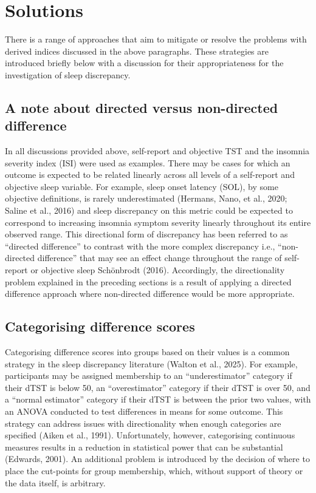\documentclass[
]{article}
\begin{document}
\section{Solutions}\label{solutions}

There is a range of approaches that aim to mitigate or resolve the problems with derived indices discussed in the above paragraphs. These strategies are introduced briefly below with a discussion for their appropriateness for the investigation of sleep discrepancy.

\subsection{A note about directed versus non-directed difference}\label{a-note-about-directed-versus-non-directed-difference}

In all discussions provided above, self-report and objective TST and the insomnia severity index (ISI) were used as examples. There may be cases for which an outcome is expected to be related linearly across all levels of a self-report and objective sleep variable. For example, sleep onset latency (SOL), by some objective definitions, is rarely underestimated (Hermans, Nano, et al., 2020; Saline et al., 2016) and sleep discrepancy on this metric could be expected to correspond to increasing insomnia symptom severity linearly throughout its entire observed range. This directional form of discrepancy has been referred to as ``directed difference'' to contrast with the more complex discrepancy i.e., ``non-directed difference'' that may see an effect change throughout the range of self-report or objective sleep Schönbrodt (2016). Accordingly, the directionality problem explained in the preceding sections is a result of applying a directed difference approach where non-directed difference would be more appropriate.

\subsection{Categorising difference scores}\label{categorising-difference-scores}

Categorising difference scores into groups based on their values is a common strategy in the sleep discrepancy literature (Walton et al., 2025). For example, participants may be assigned membership to an ``underestimator'' category if their dTST is below 50, an ``overestimator'' category if their dTST is over 50, and a ``normal estimator'' category if their dTST is between the prior two values, with an ANOVA conducted to test differences in means for some outcome. This strategy can address issues with directionality when enough categories are specified (Aiken et al., 1991). Unfortunately, however, categorising continuous measures results in a reduction in statistical power that can be substantial (Edwards, 2001). An additional problem is introduced by the decision of where to place the cut-points for group membership, which, without support of theory or the data itself, is arbitrary.
\end{document}
